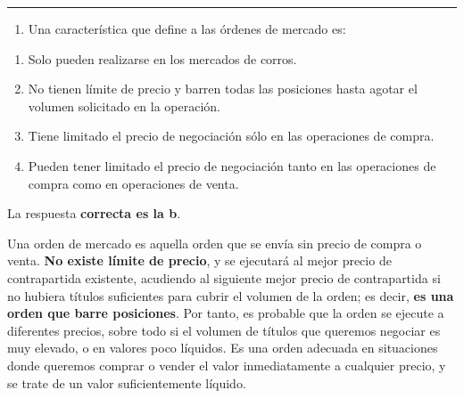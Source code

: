 \documentclass[
  letterpaper,
  DIV=11,
  numbers=noendperiod]{scrreprt}
\providecommand{\tightlist}{%
  \setlength{\itemsep}{0pt}\setlength{\parskip}{0pt}}\usepackage{longtable,booktabs,array}
\begin{document}
\begin{center}\rule{0.5\linewidth}{0.5pt}\end{center}

\begin{enumerate}
\def\labelenumi{\arabic{enumi}.}
\setcounter{enumi}{53}
\tightlist
\item
  Una característica que define a las órdenes de mercado es:
\end{enumerate}

\begin{enumerate}
\def\labelenumi{\alph{enumi})}
\item
  Solo pueden realizarse en los mercados de corros.
\item
  No tienen límite de precio y barren todas las posiciones hasta agotar
  el volumen solicitado en la operación.
\item
  Tiene limitado el precio de negociación sólo en las operaciones de
  compra.
\item
  Pueden tener limitado el precio de negociación tanto en las
  operaciones de compra como en operaciones de venta.
\end{enumerate}

\begin{tcolorbox}[enhanced jigsaw, left=2mm, opacityback=0, colback=white, breakable, arc=.35mm, bottomrule=.15mm, rightrule=.15mm, toprule=.15mm, leftrule=.75mm, colframe=quarto-callout-tip-color-frame]
\begin{minipage}[t]{5.5mm}
\textcolor{quarto-callout-tip-color}{\faLightbulb}
\end{minipage}%
\begin{minipage}[t]{\textwidth - 5.5mm}

La respuesta \textbf{correcta es la b}.

Una orden de mercado es aquella orden que se envía sin precio de compra
o venta. \textbf{No existe límite de precio}, y se ejecutará al mejor
precio de contrapartida existente, acudiendo al siguiente mejor precio
de contrapartida si no hubiera títulos suficientes para cubrir el
volumen de la orden; es decir, \textbf{es una orden que barre
posiciones}. Por tanto, es probable que la orden se ejecute a diferentes
precios, sobre todo si el volumen de títulos que queremos negociar es
muy elevado, o en valores poco líquidos. Es una orden adecuada en
situaciones donde queremos comprar o vender el valor inmediatamente a
cualquier precio, y se trate de un valor suficientemente líquido.

\end{minipage}%
\end{tcolorbox}
\end{document}
